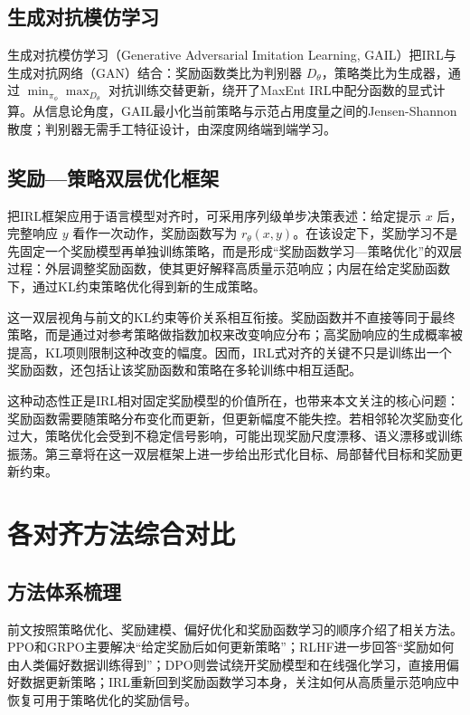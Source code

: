 \subsection{生成对抗模仿学习}

生成对抗模仿学习（Generative Adversarial Imitation Learning, GAIL）把IRL与生成对抗网络（GAN）结合：奖励函数类比为判别器 $D_\theta$，策略类比为生成器，通过 $\min_{\pi_\phi} \max_{D_\theta}$ 对抗训练交替更新，绕开了MaxEnt IRL中配分函数的显式计算。从信息论角度，GAIL最小化当前策略与示范占用度量之间的Jensen-Shannon散度；判别器无需手工特征设计，由深度网络端到端学习。


\subsection{奖励—策略双层优化框架}

把IRL框架应用于语言模型对齐时，可采用序列级单步决策表述：给定提示 $x$ 后，完整响应 $y$ 看作一次动作，奖励函数写为 $r_\theta(x,y)$。在该设定下，奖励学习不是先固定一个奖励模型再单独训练策略，而是形成“奖励函数学习—策略优化”的双层过程：外层调整奖励函数，使其更好解释高质量示范响应；内层在给定奖励函数下，通过KL约束策略优化得到新的生成策略。

这一双层视角与前文的KL约束等价关系相互衔接。奖励函数并不直接等同于最终策略，而是通过对参考策略做指数加权来改变响应分布；高奖励响应的生成概率被提高，KL项则限制这种改变的幅度。因而，IRL式对齐的关键不只是训练出一个奖励函数，还包括让该奖励函数和策略在多轮训练中相互适配。

这种动态性正是IRL相对固定奖励模型的价值所在，也带来本文关注的核心问题：奖励函数需要随策略分布变化而更新，但更新幅度不能失控。若相邻轮次奖励变化过大，策略优化会受到不稳定信号影响，可能出现奖励尺度漂移、语义漂移或训练振荡。第三章将在这一双层框架上进一步给出形式化目标、局部替代目标和奖励更新约束。


\section{各对齐方法综合对比}

\subsection{方法体系梳理}

前文按照策略优化、奖励建模、偏好优化和奖励函数学习的顺序介绍了相关方法。PPO和GRPO主要解决“给定奖励后如何更新策略”；RLHF进一步回答“奖励如何由人类偏好数据训练得到”；DPO则尝试绕开奖励模型和在线强化学习，直接用偏好数据更新策略；IRL重新回到奖励函数学习本身，关注如何从高质量示范响应中恢复可用于策略优化的奖励信号。

